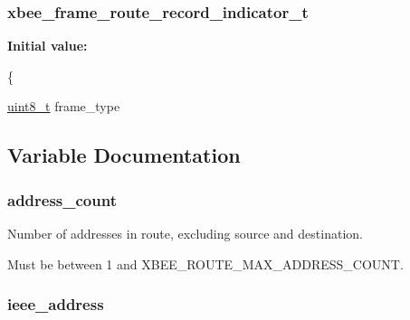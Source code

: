 \hypertarget{group__xbee__route_gac3b91f492a4301331d6c0c39c2516b0e}{
\subsubsection[{xbee\-\_\-frame\-\_\-route\-\_\-record\-\_\-indicator\-\_\-t}]{\setlength{\rightskip}{0pt plus 5cm}xbee\-\_\-frame\-\_\-route\-\_\-record\-\_\-indicator\-\_\-t}}\label{group__xbee__route_gac3b91f492a4301331d6c0c39c2516b0e}
{\bfseries Initial value\-:}
\begin{DoxyCode}
\{
   
   \hyperlink{group__hal_gae1affc9ca37cfb624959c866a73f83c2}{uint8\_t}          frame\_type
\end{DoxyCode}


\subsection{Variable Documentation}
\hypertarget{group__xbee__route_ga568b7e68dfcb5aabdbcf38de26f1b63d}{
\subsubsection[{address\-\_\-count}]{ address\-\_\-count}}\label{group__xbee__route_ga568b7e68dfcb5aabdbcf38de26f1b63d}


Number of addresses in route, excluding source and destination. 

Must be between 1 and X\-B\-E\-E\-\_\-\-R\-O\-U\-T\-E\-\_\-\-M\-A\-X\-\_\-\-A\-D\-D\-R\-E\-S\-S\-\_\-\-C\-O\-U\-N\-T. \hypertarget{group__xbee__route_ga2549f921e25a72dfa05a2154a792e2bf}{
\subsubsection[{ieee\-\_\-address}]{ ieee\-\_\-address}}\label{group__xbee__route_ga2549f921e25a72dfa05a2154a792e2bf}


